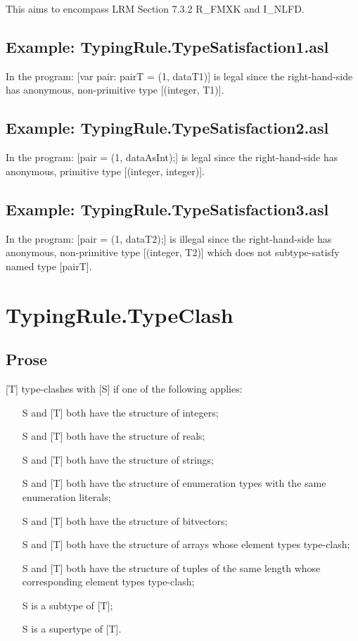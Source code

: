 \documentclass{book}
\begin{document}
  This aims to encompass LRM Section 7.3.2 R\_FMXK and I\_NLFD.

\subsection{Example: TypingRule.TypeSatisfaction1.asl}
    In the program:
    [var pair: pairT = (1, dataT1)] is legal since the right-hand-side has
    anonymous, non-primitive type [(integer, T1)].

\subsection{Example: TypingRule.TypeSatisfaction2.asl}
    In the program:
    [pair = (1, dataAsInt);] is legal since the right-hand-side has anonymous,
    primitive type [(integer, integer)].
 
\subsection{Example: TypingRule.TypeSatisfaction3.asl}
    In the program:
    [pair = (1, dataT2);] is illegal since the right-hand-side has anonymous,
    non-primitive type [(integer, T2)] which does not subtype-satisfy named
    type [pairT].

\section{TypingRule.TypeClash}

\subsection{Prose}
  [T] type-clashes with [S] if one of the following applies:
  \begin{itemize}
  \item  [S] and [T] both have the structure of integers;
  \item  [S] and [T] both have the structure of reals;
  \item  [S] and [T] both have the structure of strings;
  \item  [S] and [T] both have the structure of enumeration types with the same enumeration literals;
  \item  [S] and [T] both have the structure of bitvectors;
  \item  [S] and [T] both have the structure of arrays whose element types type-clash;
  \item  [S] and [T] both have the structure of tuples of the same length whose
    corresponding element types type-clash;
  \item  [S] is a subtype of [T];
  \item  [S] is a supertype of [T].
  \end{itemize}
\end{document}
